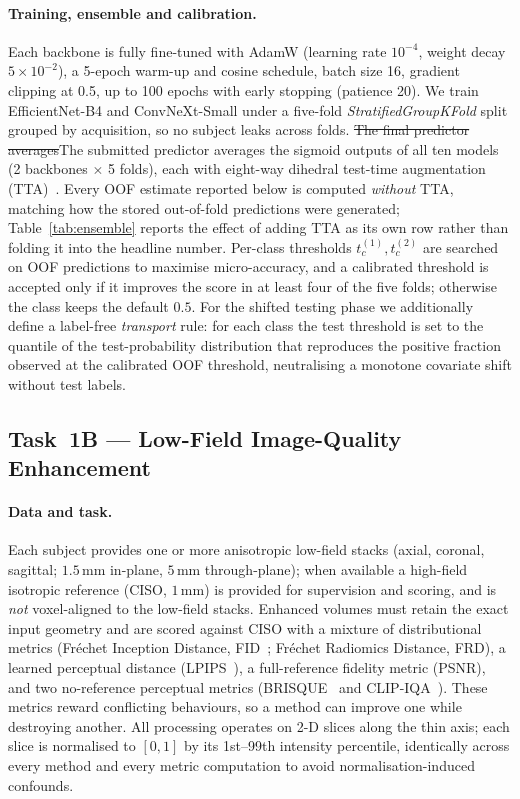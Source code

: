 \documentclass[runningheads]{llncs}
\newcommand{\addself}[1]{\textcolor{revself}{#1}}
\newcommand{\delself}[1]{\textcolor{revself}{\sout{#1}}}
\begin{document}
\paragraph{Training, ensemble and calibration.}
Each backbone is fully fine-tuned with AdamW (learning rate $10^{-4}$, weight
decay $5\!\times\!10^{-2}$), a 5-epoch warm-up and cosine schedule, batch size 16,
gradient clipping at 0.5, up to 100 epochs with early stopping (patience 20). We
train EfficientNet-B4 and ConvNeXt-Small under a five-fold
\emph{StratifiedGroupKFold} split grouped by acquisition, so no subject leaks
across folds. \delself{The final predictor averages}\addself{The submitted predictor
averages} the sigmoid outputs of all ten models
(2 backbones $\times$ 5 folds), each with eight-way dihedral test-time augmentation
\addself{(TTA)}~\cite{lakshminarayanan2017simple}. \addself{Every OOF estimate reported
below is computed \emph{without} TTA, matching how the stored out-of-fold predictions
were generated; Table~\ref{tab:ensemble} reports the effect of adding TTA as its own
row rather than folding it into the headline number.} Per-class thresholds
$t^{(1)}_c,t^{(2)}_c$ are searched on OOF predictions to maximise micro-accuracy,
and a calibrated threshold is accepted only if it improves the score in at least
four of the five folds; otherwise the class keeps the default $0.5$. For the
shifted testing phase we additionally define a label-free \emph{transport} rule:
for each class the test threshold is set to the quantile of the test-probability
distribution that reproduces the positive fraction observed at the calibrated OOF
threshold, neutralising a monotone covariate shift without test labels.

\subsection{Task~1B --- Low-Field Image-Quality Enhancement}
\label{sec:m1b}

\paragraph{Data and task.}
Each subject provides one or more anisotropic low-field stacks (axial, coronal,
sagittal; $1.5$\,mm in-plane, $5$\,mm through-plane); when available a high-field
isotropic reference (CISO, $1$\,mm) is provided for supervision and scoring, and
is \emph{not} voxel-aligned to the low-field stacks. Enhanced volumes must retain
the exact input geometry and are scored against CISO with a mixture of
distributional metrics (Fr\'echet Inception Distance, FID~\cite{heusel2017fid};
Fr\'echet Radiomics Distance, FRD), a learned perceptual distance
(LPIPS~\cite{zhang2018lpips}), a full-reference fidelity metric (PSNR), and two
no-reference perceptual metrics (BRISQUE~\cite{mittal2012brisque} and
CLIP-IQA~\cite{wang2023clipiqa}). These metrics reward conflicting behaviours, so
a method can improve one while destroying another. All processing operates on 2-D
slices along the thin axis; each slice is normalised to $[0,1]$ by its 1st--99th
intensity percentile, identically across every method and every metric
computation to avoid normalisation-induced confounds.
\end{document}
